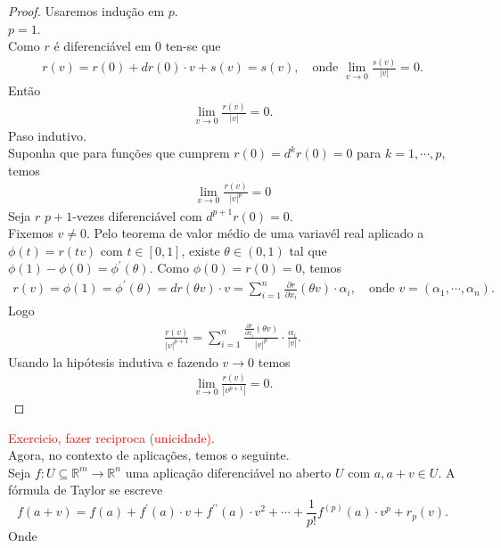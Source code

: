 \begin{proof} 
  Usaremos indução em $p$.\\
  $p=1$.\\
  Como $r$ é diferenciável em $0$ ten-se que
  \begin{align*}
    r(v)=r(0)+dr(0)\cdot v+s(v)=s(v),\quad\text{onde }\lim_{v \to 0}\frac{s(v)}{|v|}=0.
  \end{align*}
  Então
  \begin{align*}
    \lim_{v \to 0}\frac{r(v)}{|v|}=0.
  \end{align*}
  Paso indutivo.\\
  Suponha que para funções que cumprem $r(0)=d^{k}r(0)=0$ para $k=1,\cdots,p$, temos 
  \begin{align*}
    \lim_{v \to 0}\frac{r(v)}{|v|^{p}}=0
  \end{align*}
  Seja $r$ $p+1$-vezes diferenciável com $d^{p+1}r(0)=0$.\\
  Fixemos $v\neq 0$. Pelo teorema de valor médio de uma variavél real aplicado a $\phi(t)=r(tv)$ com $t\in[0,1]$, existe $\theta\in(0,1)$ tal que $\phi(1)-\phi(0)=\phi^{\prime}(\theta)$. Como $\phi(0)=r(0)=0$, temos
  \begin{align*}
    r(v)=\phi(1)=\phi^{\prime}(\theta)=dr(\theta v)\cdot v=\sum_{i=1}^{n}\frac{\partial r}{\partial x_i}(\theta v)\cdot \alpha_i,\quad\text{onde }v=(\alpha_1,\cdots,\alpha_n).
  \end{align*}
  Logo
  \begin{align*}
    \frac{r(v)}{|v|^{p+1}}=\sum_{i=1}^{n}\frac{\frac{\partial r}{\partial x_i}(\theta v)}{|v|^{p}}\cdot \frac{\alpha_i}{|v|}.
  \end{align*}
  Usando la hipótesis indutiva e fazendo $v\to 0$ temos
  \begin{align*}
    \lim_{v \to 0}\frac{r(v)}{|v^{p+1}|}=0.
  \end{align*}
\end{proof}
\textcolor{red}{Exercicio, fazer reciproca (unicidade).}\\
Agora, no contexto de aplicações, temos o seguinte.\\
Seja $f:U\subseteq\mathbb{R}^{m}\to\mathbb{R}^{n}$ uma aplicação diferenciável no aberto $U$ com $a,a+v\in U$. A fórmula de Taylor se escreve
\begin{equation}\label{eq:formula-de-taylor-para-aplicacoes}
  f(a+v)=f(a)+f^{\prime}(a)\cdot v+f^{\prime\prime}(a)\cdot v^{2}+\cdots+\frac{1}{p!}f^{(p)}(a)\cdot v^{p}+r_p(v).
\end{equation}
Onde

